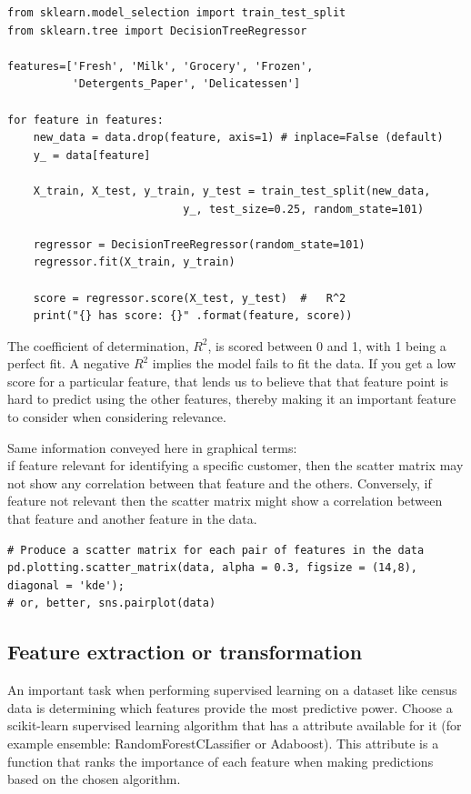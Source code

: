 \documentclass[11pt]{article}
\begin{document}
\begin{lstlisting}
from sklearn.model_selection import train_test_split
from sklearn.tree import DecisionTreeRegressor

features=['Fresh', 'Milk', 'Grocery', 'Frozen', 
		  'Detergents_Paper', 'Delicatessen']

for feature in features:        
	new_data = data.drop(feature, axis=1) # inplace=False (default)
	y_ = data[feature]

	X_train, X_test, y_train, y_test = train_test_split(new_data, 
	                       y_, test_size=0.25, random_state=101)

	regressor = DecisionTreeRegressor(random_state=101)
	regressor.fit(X_train, y_train)

	score = regressor.score(X_test, y_test)  #   R^2
	print("{} has score: {}" .format(feature, score))
\end{lstlisting}
{\small The coefficient of determination, $R^2$, is scored between 0 and 1, with 1 being a perfect fit. A negative $R^2$ implies the model fails to fit the data. If you get a low score for a particular feature, that lends us to believe that that feature point is hard to predict using the other features, thereby making it an important feature to consider when considering relevance.}

{\small Same information conveyed here in graphical terms: \\
if feature relevant for identifying a specific customer, then the scatter matrix may not show any correlation between that feature and the others. Conversely, if feature not relevant then the scatter matrix might show a correlation between that feature and another feature in the data.}
\begin{lstlisting}
# Produce a scatter matrix for each pair of features in the data
pd.plotting.scatter_matrix(data, alpha = 0.3, figsize = (14,8), diagonal = 'kde');
# or, better, sns.pairplot(data)
\end{lstlisting}

\subsection{Feature extraction or transformation} \label{feature_extraction}
An important task when performing supervised learning on a dataset like census data is determining which features provide the most predictive power.
Choose a scikit-learn supervised learning algorithm that has a  attribute available for it (for example ensemble: RandomForestCLassifier or Adaboost). This attribute is a function that ranks the importance of each feature when making predictions based on the chosen algorithm.
\end{document}
